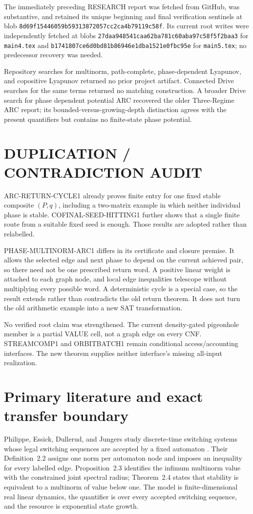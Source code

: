 \documentclass[11pt]{article}
\begin{document}
The immediately preceding RESEARCH report was fetched from GitHub, was
substantive, and retained its unique beginning and final verification
sentinels at blob
\texttt{8d69f15446059b59313872057cc2ca4b79119c58f}.  Its current root writes
were independently fetched at blobs
\texttt{27daa948541caa62ba781c60aba97c58f5f2baa3} for
\texttt{main4.tex} and
\texttt{b1741807ce6d0bd81b86946e1dba1521e0fbc95e} for
\texttt{main5.tex}; no predecessor recovery was needed.

Repository searches for multinorm, path-complete, phase-dependent Lyapunov,
and copositive Lyapunov returned no prior project artifact.  Connected Drive
searches for the same terms returned no matching construction.  A broader
Drive search for phase dependent potential ARC recovered the older
Three-Regime ARC report; its bounded-versus-growing-depth distinction agrees
with the present quantifiers but contains no finite-state phase potential.

\section{DUPLICATION / CONTRADICTION AUDIT}
ARC-RETURN-CYCLE1 already proves finite entry for one fixed stable composite
\((P,q)\), including a two-matrix example in which neither individual phase
is stable.  COFINAL-SEED-HITTING1 further shows that a single finite route
from a suitable fixed seed is enough.  Those results are adopted rather than
relabelled.

PHASE-MULTINORM-ARC1 differs in its certificate and closure premise.  It
allows the selected edge and next phase to depend on the current achieved
pair, so there need not be one prescribed return word.  A positive linear
weight is attached to each graph node, and local edge inequalities telescope
without multiplying every possible word.  A deterministic cycle is a
special case, so the result extends rather than contradicts the old return
theorem.  It does not turn the old arithmetic example into a new SAT
transformation.

No verified root claim was strengthened.  The current density-gated
pigeonhole member is a partial VALUE cell, not a graph edge on every CNF.
STREAMCOMP1 and ORBITBATCH1 remain conditional access/accounting interfaces.
The new theorem supplies neither interface's missing all-input realization.

\section{Primary literature and exact transfer boundary}
Philippe, Essick, Dullerud, and Jungers study discrete-time switching systems
whose legal switching sequences are accepted by a fixed automaton
\cite{arc0007PhilippeMultinorm}.  Their Definition~2.2 assigns one norm per
automaton node and imposes an inequality for every labelled edge.
Proposition~2.3 identifies the infimum multinorm value with the constrained
joint spectral radius; Theorem~2.4 states that stability is equivalent to a
multinorm of value below one.  The model is finite-dimensional real linear
dynamics, the quantifier is over every accepted switching sequence, and the
resource is exponential state growth.
\end{document}
